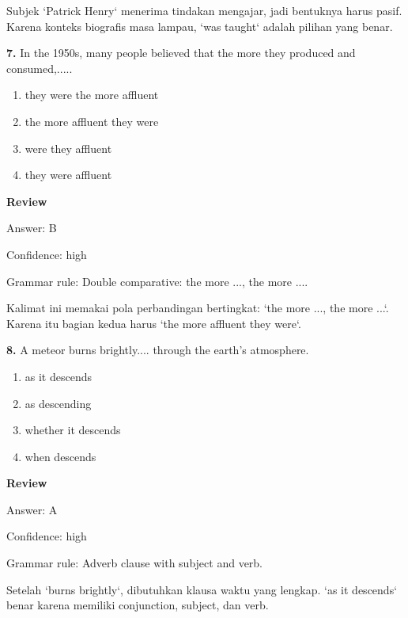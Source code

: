 \documentclass[12pt]{article}
\begin{document}
Subjek `Patrick Henry` menerima tindakan mengajar, jadi bentuknya harus pasif. Karena konteks biografis masa lampau, `was taught` adalah pilihan yang benar.\par
\endgroup
\par
\vspace{0.25\baselineskip}
\noindent\textbf{7.} In the 1950s, many people believed that the more they produced and consumed,.....
\begin{enumerate}[label=(\Alph*),leftmargin=*,itemsep=0.2em]
\item they were the more affluent
\item the more affluent they were
\item were they affluent
\item they were affluent
\end{enumerate}
\par
\begingroup
\setlength{\parskip}{0pt}
\setlength{\parindent}{0pt}
\textbf{Review}\par
Answer: B\par
Confidence: high\par
Grammar rule: Double comparative: the more ..., the more ....\par
Kalimat ini memakai pola perbandingan bertingkat: `the more ..., the more ...`. Karena itu bagian kedua harus `the more affluent they were`.\par
\endgroup
\par
\vspace{0.25\baselineskip}
\noindent\textbf{8.} A meteor burns brightly.... through the earth's atmosphere.
\begin{enumerate}[label=(\Alph*),leftmargin=*,itemsep=0.2em]
\item as it descends
\item as descending
\item whether it descends
\item when descends
\end{enumerate}
\par
\begingroup
\setlength{\parskip}{0pt}
\setlength{\parindent}{0pt}
\textbf{Review}\par
Answer: A\par
Confidence: high\par
Grammar rule: Adverb clause with subject and verb.\par
Setelah `burns brightly`, dibutuhkan klausa waktu yang lengkap. `as it descends` benar karena memiliki conjunction, subject, dan verb.\par
\end{document}
